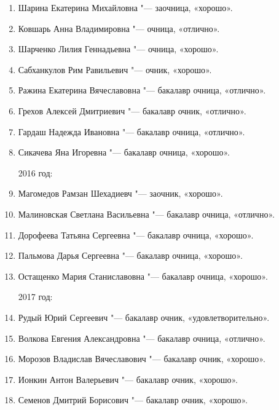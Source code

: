 \begin{enumerate}[nosep]
{2015 год:}
	\item Шарина Екатерина Михайловна "--- заочница, «хорошо».
	\item Ковшарь Анна Владимировна "--- очница, «отлично».
	\item Шарченко Лилия Геннадьевна "--- очница, «хорошо».
	\item Сабханкулов Рим Равильевич "--- очник, «хорошо».
	\item Ражина Екатерина Вячеславовна "--- бакалавр очница, «отлично».
	\item Грехов Алексей Дмитриевич "--- бакалавр очник, «отлично».
	\item Гардаш Надежда Ивановна "--- бакалавр очница, «отлично».
	\item Сикачева Яна Игоревна "--- бакалавр очница, «хорошо».
	
{2016 год:}
	\item Магомедов Рамзан Шехадиевч "--- заочник, «хорошо».
	\item Малиновская Светлана Васильевна "--- бакалавр очница, «отлично».
	\item Дорофеева Татьяна Сергеевна "--- бакалавр очница, «хорошо».
	\item Пальмова Дарья Сергеевна "--- бакалавр очница, «хорошо».
	\item Остащенко Мария Станиславовна "--- бакалавр очница, «хорошо».
	
{2017 год:}
	\item Рудый Юрий Сергеевич "--- бакалавр очник, «удовлетворительно».
	\item Волкова Евгения Александровна "--- бакалавр очница, «отлично».
	\item Морозов Владислав Вячеславович "--- бакалавр очник, «хорошо».
	\item Ионкин Антон Валерьевич "--- бакалавр очник, «хорошо».
	\item Семенов Дмитрий Борисович "--- бакалавр очник, «хорошо».
\end{enumerate}
